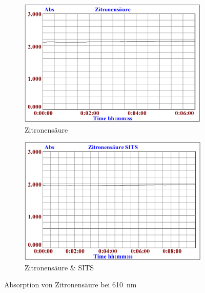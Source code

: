 \documentclass[a4paper,german]{scrreprt}
\begin{document}
\begin{figure}
	\centering
	\begin{subfigure}{.5\textwidth}
		\centering
		\includegraphics[width=\linewidth]{img/haem_citric.png}
		\caption{Zitronensäure}
	\end{subfigure}%
	\begin{subfigure}{.5\textwidth}
		\centering
		\includegraphics[width=\linewidth]{img/haem_citric_sits.png}
		\caption{Zitronensäure \& SITS}
	\end{subfigure}
	\caption{Absorption von Zitronensäure bei \SI{610}{nm}}
	\label{fig:haem_citric}
\end{figure}
\end{document}
